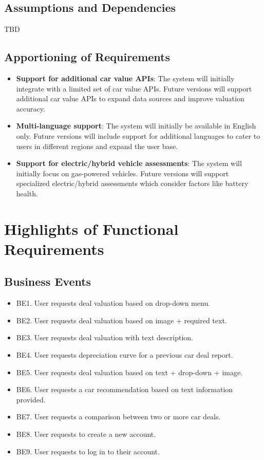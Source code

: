 \documentclass[]{article}
\begin{document}
\subsection{Assumptions and Dependencies}
\label{sub:assumptions_and_dependencies}
TBD

\subsection{Apportioning of Requirements}
\label{sub:apportioning_of_requirements}
\begin{itemize}
    \item \textbf{Support for additional car value APIs}: The system will initially integrate with a limited set of car value APIs. Future versions will support additional car value APIs to expand data sources and improve valuation accuracy.
    \item \textbf{Multi-language support}: The system will initially be available in English only. Future versions will include support for additional languages to cater to users in different regions and expand the user base.
    \item \textbf{Support for electric/hybrid vehicle assessments}: The system will initially focus on gas-powered vehicles. Future versions will support specialized electric/hybrid assessments which consider factors like battery health.
\end{itemize}

\newpage
\section{Highlights of Functional Requirements}
\label{sec:functional_requirements}

\subsection{Business Events}
\begin{itemize}
    \item BE1. User requests deal valuation based on drop-down menu.
    \item BE2. User requests deal valuation based on image + required text.
    \item BE3. User requests deal valuation with text description.
    \item BE4. User requests depreciation curve for a previous car deal report.
    \item BE5. User requests deal valuation based on text + drop-down + image.
    \item BE6. User requests a car recommendation based on text information provided.
    \item BE7. User requests a comparison between two or more car deals.
    \item BE8. User requests to create a new account.
    \item BE9. User requests to log in to their account.
\end{itemize}
\end{document}
